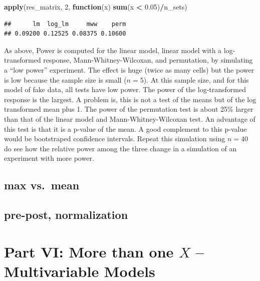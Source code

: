 \documentclass[]{book}
\newenvironment{Shaded}{\begin{snugshade}}{\end{snugshade}}
\newcommand{\ControlFlowTok}[1]{\textcolor[rgb]{0.13,0.29,0.53}{\textbf{#1}}}
\newcommand{\DecValTok}[1]{\textcolor[rgb]{0.00,0.00,0.81}{#1}}
\newcommand{\FloatTok}[1]{\textcolor[rgb]{0.00,0.00,0.81}{#1}}
\newcommand{\KeywordTok}[1]{\textcolor[rgb]{0.13,0.29,0.53}{\textbf{#1}}}
\newcommand{\NormalTok}[1]{#1}
\newcommand{\OperatorTok}[1]{\textcolor[rgb]{0.81,0.36,0.00}{\textbf{#1}}}
\newcommand{\StringTok}[1]{\textcolor[rgb]{0.31,0.60,0.02}{#1}}
\begin{document}
\begin{Shaded}
\begin{Highlighting}[]
\KeywordTok{apply}\NormalTok{(res_matrix, }\DecValTok{2}\NormalTok{, }\ControlFlowTok{function}\NormalTok{(x) }\KeywordTok{sum}\NormalTok{(x }\OperatorTok{<}\StringTok{ }\FloatTok{0.05}\NormalTok{)}\OperatorTok{/}\NormalTok{n_sets)}
\end{Highlighting}
\end{Shaded}

\begin{verbatim}
##      lm  log_lm     mww    perm 
## 0.09200 0.12525 0.08375 0.10600
\end{verbatim}

As above, Power is computed for the linear model, linear model with a log-transformed response, Mann-Whitney-Wilcoxan, and permutation, by simulating a ``low power'' experiment. The effect is huge (twice as many cells) but the power is low because the sample size is small (\(n = 5\)). At this sample size, and for this model of fake data, all tests have low power. The power of the log-transformed response is the largest. A problem is, this is not a test of the means but of the log transformed mean plus 1. The power of the permutation test is about 25\% larger than that of the linear model and Mann-Whitney-Wilcoxan test. An advantage of this test is that it is a p-value of the mean. A good complement to this p-value would be bootstraped confidence intervals. Repeat this simulation using \(n=40\) do see how the relative power among the three change in a simulation of an experiment with more power.

\hypertarget{max-vs.-mean}{%
\section{max vs.~mean}\label{max-vs.-mean}}

\hypertarget{pre-post-normalization}{%
\section{pre-post, normalization}\label{pre-post-normalization}}

\hypertarget{part-vi-more-than-one-x-multivariable-models}{%
\chapter*{\texorpdfstring{Part VI: More than one \(X\) -- Multivariable Models}{Part VI: More than one X -- Multivariable Models}}\label{part-vi-more-than-one-x-multivariable-models}}
\end{document}
